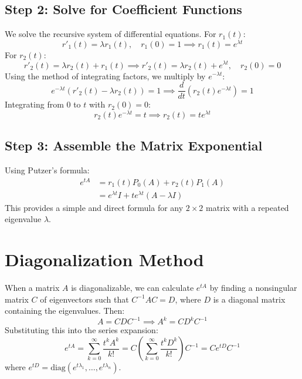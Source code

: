 \documentclass[12pt,a4paper]{report}
\theoremstyle{definition}
\numberwithin{equation}{chapter}
\begin{document}
\subsection*{Step 2: Solve for Coefficient Functions}
We solve the recursive system of differential equations.
For $r_1(t)$:
\begin{equation}
r'_1(t) = \lambda r_1(t), \quad r_1(0) = 1 \implies r_1(t) = e^{\lambda t}
\end{equation}
For $r_2(t)$:
\begin{equation}
r'_2(t) = \lambda r_2(t) + r_1(t) \implies r'_2(t) = \lambda r_2(t) + e^{\lambda t}, \quad r_2(0) = 0
\end{equation}
Using the method of integrating factors, we multiply by $e^{-\lambda t}$:
\begin{equation}
e^{-\lambda t} \left( r'_2(t) - \lambda r_2(t) \right) = 1 \implies \frac{d}{dt} \left( r_2(t) e^{-\lambda t} \right) = 1
\end{equation}
Integrating from $0$ to $t$ with $r_2(0) = 0$:
\begin{equation}
r_2(t) e^{-\lambda t} = t \implies r_2(t) = t e^{\lambda t}
\end{equation}

\subsection*{Step 3: Assemble the Matrix Exponential}
Using Putzer's formula:
\begin{equation}
\begin{aligned}
e^{tA} &= r_1(t) P_0(A) + r_2(t) P_1(A) \\
      &= e^{\lambda t} I + t e^{\lambda t} (A - \lambda I)
\end{aligned}
\end{equation}
This provides a simple and direct formula for any $2 \times 2$ matrix with a repeated eigenvalue $\lambda$.

\section{Diagonalization Method}
When a matrix $A$ is diagonalizable, we can calculate $e^{tA}$ by finding a nonsingular matrix $C$ of eigenvectors such that $C^{-1}AC = D$, where $D$ is a diagonal matrix containing the eigenvalues. Then:
\begin{equation}
A = CDC^{-1} \implies A^k = CD^k C^{-1}
\end{equation}
Substituting this into the series expansion:
\begin{equation}
e^{tA} = \sum_{k=0}^\infty \frac{t^k A^k}{k!} = C \left( \sum_{k=0}^\infty \frac{t^k D^k}{k!} \right) C^{-1} = C e^{tD} C^{-1}
\end{equation}
where $e^{tD} = \text{diag}(e^{t\lambda_1}, \ldots, e^{t\lambda_n})$.
\end{document}
